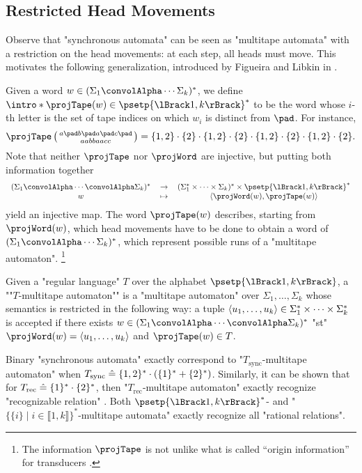 \subsection{Restricted Head Movements}

Observe that "synchronous automata" can be seen as "multitape automata" with
a restriction on the head movements: at each step, all heads must move.
This motivates the following generalization, introduced by Figueira and Libkin in
\cite{FigueiraLibkin2015SynchronizingRelations}.

Given a word $w \in (\Sigma_1 \convolAlpha \cdots \Sigma_k)^*$,
we define \AP$\intro*\projTape(w) \in \psetp{\lBrack 1,k\rBrack}^*$ to be the word
whose $i$-th letter is the set of tape indices on which $w_i$ is distinct from $\pad$. 
For instance,
\[
	\projTape\pair{a \pad b \pad a \pad c \pad}{a a b b a a c c}
	= \{1,2\} \cdot \{2\} \cdot \{1,2\} \cdot \{2\} \cdot \{1,2\} \cdot \{2\} \cdot \{1,2\} \cdot \{2\}.
\]
Note that neither $\projTape$ nor $\projWord$ are injective, but putting both information together 
\[
	\begin{tabular}{ccc}
		$(\Sigma_1 \convolAlpha \cdots \convolAlpha \Sigma_k)^*$ & $\to$
			& $(\Sigma_1^* \times \cdots \times \Sigma_k)^* \times \psetp{\lBrack 1,k\rBrack}^*$\\
		$w$ & $\mapsto$ & $\tup{\projWord(w), \projTape(w)}$
	\end{tabular}
\]
yield an injective map.
The word $\projTape(w)$ describes, starting from $\projWord(w)$, which 
head movements have to be done to obtain a word of $(\Sigma_1 \convolAlpha \cdots \Sigma_k)^*$, which represent possible runs of a "multitape automaton".%
\footnote{The information $\projTape$ is not unlike what is called
``origin information'' for transducers \cite{Bojanczyk2014TransducersOriginInformation}.}

Given a "regular language" $T$ over the alphabet $\psetp{\lBrack 1,k\rBrack}$,
a \AP""$T$-multitape automaton"" is a "multitape automaton" over $\Sigma_1,\hdots,\Sigma_k$
whose semantics is restricted in the following way:
a tuple $\langle u_1,\hdots,u_k\rangle \in \Sigma_1^* \times \cdots \times \Sigma_k^*$ is accepted
if there exists $w \in (\Sigma_1 \convolAlpha \cdots \convolAlpha \Sigma_k)^*$
"st" $\projWord(w) = \tup{u_1,\hdots,u_k}$ and $\projTape(w) \in T$.

Binary "synchronous automata" exactly correspond to "$T_{\textrm{sync}}$-multitape automaton" when
$T_{\textrm{sync}} \mathrel{\hat{=}} \{1,2\}^* \cdot (\{1\}^* + \{2\}^*)$. Similarly, it can be shown
that for $T_{\textrm{rec}} \mathrel{\hat{=}} \{1\}^* \cdot \{2\}^*$, then "$T_{\textrm{rec}}$-multitape automaton" exactly recognize "recognizable relation"
\cite[Proposition~1]{FigueiraLibkin2015SynchronizingRelations}.
Both $\psetp{\lBrack 1,k\rBrack}^*$- and
"$\{\{i\} \mid i \in \lBrack 1,k\rBrack\}^*$-multitape automata"
exactly recognize all "rational relations".%

